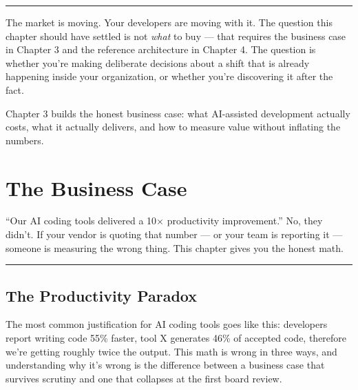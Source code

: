\documentclass[
  a4paper,
  DIV=11,
  numbers=noendperiod]{scrreprt}
\begin{document}
\begin{center}\rule{0.5\linewidth}{0.5pt}\end{center}

The market is moving. Your developers are moving with it. The question
this chapter should have settled is not \emph{what} to buy --- that
requires the business case in Chapter 3 and the reference architecture
in Chapter 4. The question is whether you're making deliberate decisions
about a shift that is already happening inside your organization, or
whether you're discovering it after the fact.

Chapter 3 builds the honest business case: what AI-assisted development
actually costs, what it actually delivers, and how to measure value
without inflating the numbers.

\chapter{The Business Case}\label{the-business-case}

``Our AI coding tools delivered a 10× productivity improvement.'' No,
they didn't. If your vendor is quoting that number --- or your team is
reporting it --- someone is measuring the wrong thing. This chapter
gives you the honest math.

\begin{center}\rule{0.5\linewidth}{0.5pt}\end{center}

\section{The Productivity Paradox}\label{the-productivity-paradox}

The most common justification for AI coding tools goes like this:
developers report writing code 55\% faster, tool X generates 46\% of
accepted code, therefore we're getting roughly twice the output. This
math is wrong in three ways, and understanding why it's wrong is the
difference between a business case that survives scrutiny and one that
collapses at the first board review.
\end{document}
